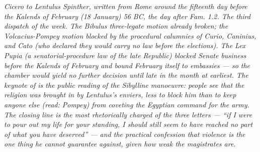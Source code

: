 
\textit{Cicero to Lentulus Spinther, written from Rome around
the fifteenth day before the Kalends of February (18 January)
56 BC, the day after Fam. 1.2. The third dispatch of the week.
The Bibulus three-legate motion already broken; the
Volcacius-Pompey motion blocked by the procedural calumnies
of Curio, Caninius, and Cato (who declared they would carry
no law before the elections). The Lex Pupia (a senatorial-procedure
law of the late Republic) blocked Senate business before the
Kalends of February and bound February itself to embassies ---
so the chamber would yield no further decision until late
in the month at earliest. The keynote of  is the
public reading of the Sibylline manoeuvre: people see that
the religion was brought in by Lentulus's enviers, less to
block him than to keep anyone else (read: Pompey) from coveting
the Egyptian command for the army. The closing line is the
most rhetorically charged of the three letters --- ``if I were
to pour out my life for your standing, I should still seem
to have reached no part of what you have deserved'' --- and
the practical confession that violence is the one thing he
cannot guarantee against, given how weak the magistrates are.}
